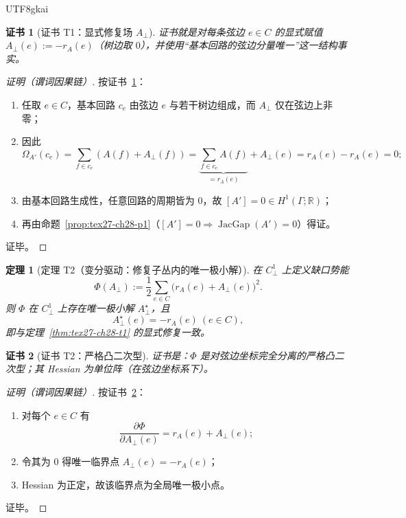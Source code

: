 \documentclass[12pt]{article}
\newtheorem{theorem}{定理}[section]
\newtheorem{Certificate}{证书}[section]
\newcommand{\RR}{\mathbb{R}}
\newcommand{\JacGap}{\operatorname{JacGap}}
\begin{document}
\begin{CJK*}{UTF8}{gkai}
\begin{Certificate}[证书 T1：显式修复场 $A_\perp$]
\label{cert:tex27-ch28-t1}
证书就是对每条弦边 $e\in C$ 的显式赋值 $A_\perp(e):=-r_A(e)$（树边取 $0$），并使用“基本回路的弦边分量唯一”这一结构事实。
\end{Certificate}

\begin{proof}[证明（谓词因果链）]
按证书~\ref{cert:tex27-ch28-t1}：
\begin{enumerate}
  \item 任取 $e\in C$，基本回路 $c_e$ 由弦边 $e$ 与若干树边组成，而 $A_\perp$ 仅在弦边上非零；
  \item 因此
  \[
    \Omega_{A'}(c_e)=\sum_{f\in c_e}(A(f)+A_\perp(f))
    =\underbrace{\sum_{f\in c_e}A(f)}_{=r_A(e)}+A_\perp(e)
    =r_A(e)-r_A(e)=0;
  \]
  \item 由基本回路生成性，任意回路的周期皆为 $0$，故 $[A']=0\in H^1(\Gamma;\RR)$；
  \item 再由命题~\ref{prop:tex27-ch28-p1}（$[A']=0\Rightarrow\JacGap(A')=0$）得证。
\end{enumerate}
证毕。
\end{proof}

\begin{theorem}[定理 T2（变分驱动：修复子丛内的唯一极小解）]
\label{thm:tex27-ch28-t2}
在 $C^1_\perp$ 上定义缺口势能
\[
  \Phi(A_\perp):=\frac12\sum_{e\in C}\bigl(r_A(e)+A_\perp(e)\bigr)^2.
\]
则 $\Phi$ 在 $C^1_\perp$ 上存在唯一极小解 $A_\perp^\star$，且
\[
  A_\perp^\star(e)=-r_A(e)\ (e\in C),
\]
即与定理~\ref{thm:tex27-ch28-t1} 的显式修复一致。
\end{theorem}

\begin{Certificate}[证书 T2：严格凸二次型]
\label{cert:tex27-ch28-t2}
证书是：$\Phi$ 是对弦边坐标完全分离的严格凸二次型；其 Hessian 为单位阵（在弦边坐标系下）。
\end{Certificate}

\begin{proof}[证明（谓词因果链）]
按证书~\ref{cert:tex27-ch28-t2}：
\begin{enumerate}
  \item 对每个 $e\in C$ 有
  \[
    \frac{\partial\Phi}{\partial A_\perp(e)}=r_A(e)+A_\perp(e);
  \]
  \item 令其为 $0$ 得唯一临界点 $A_\perp(e)=-r_A(e)$；
  \item Hessian 为正定，故该临界点为全局唯一极小点。
\end{enumerate}
证毕。
\end{proof}


\end{CJK*}
\end{document}

